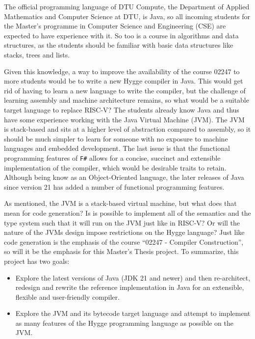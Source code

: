 The official programming language of DTU Compute, the Department of Applied Mathematics and Computer Science at DTU, is Java, so
all incoming students for the Master's programme in Computer Science and Engineering (CSE) are expected to have experience with it.
So too is a course in algorithms and data structures, as the students should be familiar with basic data structures like stacks, trees and lists.

Given this knowledge, a way to improve the availability of the course 02247 to more students would be to write a new Hygge compiler in Java. 
This would get rid of having to learn a new language to write the compiler, but the challenge of learning assembly and machine architecture remains,
so what would be a suitable target language to replace RISC-V? The students already know Java and thus have some experience working with 
the Java Virtual Machine (JVM). The JVM is stack-based and sits at a higher level of abstraction compared to assembly\cite{jvm_spec}, so it should be much simpler 
to learn for someone with no exposure to machine languages and embedded development. The last issue is that the functional programming features
of \texttt{F\#} allows for a concise, succinct and extensible implementation of the compiler, which would be desirable traits to retain. 
Although being know as an Object-Oriented language, the later releases of Java since version 21 has added a number of functional programming features.

As mentioned, the JVM is a stack-based virtual machine\cite{jvm_spec}, but what does that mean for code generation? Is is possible to implement all of the semantics
and the type system such that it will run on the JVM just like in RISC-V? Or will the nature of the JVMs design impose restrictions on the Hygge language?
Just like code generation is the emphasis of the course ``02247 - Compiler Construction''\cite{curriculum_02247}, so will it be the emphasis for this Master's Thesis project.
To summarize, this project has two goals:

\begin{itemize}
    \item Explore the latest versions of Java (JDK 21 and newer) and then re-architect, redesign and rewrite the reference implementation in Java for an extensible, flexible and user-friendly compiler.
    \item Explore the JVM and its bytecode target language and attempt to implement as many features of the Hygge programming language as possible on the JVM.
\end{itemize}
